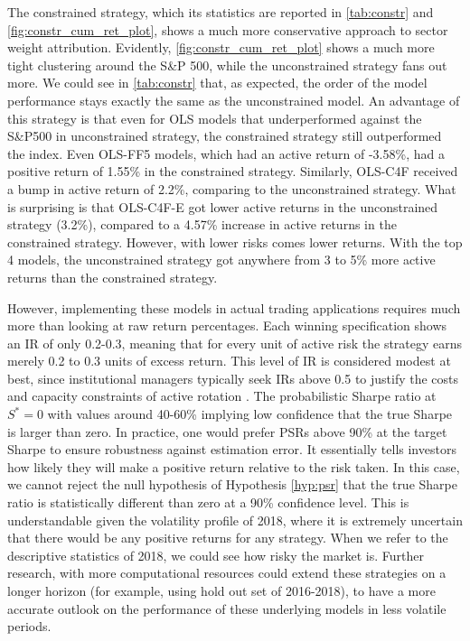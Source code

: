 The constrained strategy, which its statistics are reported in \cref{tab:constr} and \cref{fig:constr_cum_ret_plot}, shows a much more conservative approach to sector weight attribution. Evidently, \cref{fig:constr_cum_ret_plot} shows a much more tight clustering around the S\&P 500, while the unconstrained strategy fans out more. We could see in \cref{tab:constr} that, as expected, the order of the model performance stays exactly the same as the unconstrained model. An advantage of this strategy is that even for OLS models that underperformed against the S\&P500 in unconstrained strategy, the constrained strategy still outperformed the index. Even OLS-FF5 models, which had an active return of -3.58\%, had a positive return of 1.55\% in the constrained strategy. Similarly, OLS-C4F received a bump in active return of 2.2\%, comparing to the unconstrained strategy. What is surprising is that OLS-C4F-E got lower active returns in the unconstrained strategy (3.2\%), compared to a 4.57\% increase in active returns in the constrained strategy. However, with lower risks comes lower returns. With the top 4 models, the unconstrained strategy got anywhere from 3 to 5\% more active returns than the constrained strategy.

However, implementing these models in actual trading applications requires much more than looking at raw return percentages. Each winning specification shows an IR of only 0.2-0.3, meaning that for every unit of active risk the strategy earns merely 0.2 to 0.3 units of excess return. This level of IR is considered modest at best, since institutional managers typically seek IRs above 0.5 to justify the costs and capacity constraints of active rotation \cite{gratton_2025}. The probabilistic Sharpe ratio at $S^{*} = 0$  with values around 40-60\% implying low confidence that the true Sharpe is larger than zero. In practice, one would prefer PSRs above 90\% at the target Sharpe to ensure robustness against estimation error. It essentially tells investors how likely they will make a positive return relative to the risk taken. In this case, we cannot reject the null hypothesis of Hypothesis \ref{hyp:psr} that the true Sharpe ratio is statistically different than zero at a 90\% confidence level. This is understandable given the volatility profile of 2018, where it is extremely uncertain that there would be any positive returns for any strategy. When we refer to the descriptive statistics of 2018, we could see how risky the market is.  Further research, with more computational resources could extend these strategies on a longer horizon (for example, using hold out set of 2016-2018), to have a more accurate outlook on the performance of these underlying models in less volatile periods.



